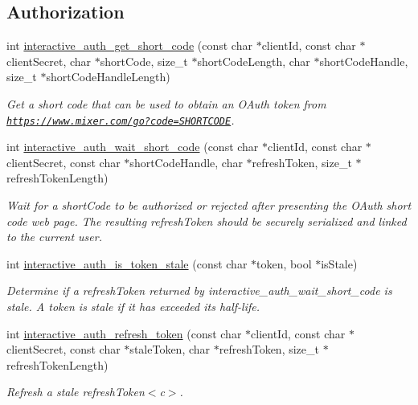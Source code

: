 \subsection*{Authorization}
\begin{DoxyCompactItemize}
\item 
int \mbox{\hyperlink{group___interactivity_ga933fa6f40b4d9728b20286badcf0b4f5}{interactive\+\_\+auth\+\_\+get\+\_\+short\+\_\+code}} (const char $\ast$client\+Id, const char $\ast$client\+Secret, char $\ast$short\+Code, size\+\_\+t $\ast$short\+Code\+Length, char $\ast$short\+Code\+Handle, size\+\_\+t $\ast$short\+Code\+Handle\+Length)
\begin{DoxyCompactList}\small\item\em Get a short code that can be used to obtain an O\+Auth token from {\ttfamily \href{https://www.mixer.com/go?code=SHORTCODE}{\tt https\+://www.\+mixer.\+com/go?code=\+S\+H\+O\+R\+T\+C\+O\+DE}}. \end{DoxyCompactList}\item 
int \mbox{\hyperlink{group___interactivity_ga16c877f68b6ff400719fc50e3c824a83}{interactive\+\_\+auth\+\_\+wait\+\_\+short\+\_\+code}} (const char $\ast$client\+Id, const char $\ast$client\+Secret, const char $\ast$short\+Code\+Handle, char $\ast$refresh\+Token, size\+\_\+t $\ast$refresh\+Token\+Length)
\begin{DoxyCompactList}\small\item\em Wait for a {\ttfamily short\+Code} to be authorized or rejected after presenting the O\+Auth short code web page. The resulting {\ttfamily refresh\+Token} should be securely serialized and linked to the current user. \end{DoxyCompactList}\item 
int \mbox{\hyperlink{group___interactivity_gadc0bce85838a4ef26479f05cee15ce3f}{interactive\+\_\+auth\+\_\+is\+\_\+token\+\_\+stale}} (const char $\ast$token, bool $\ast$is\+Stale)
\begin{DoxyCompactList}\small\item\em Determine if a {\ttfamily refresh\+Token} returned by {\ttfamily interactive\+\_\+auth\+\_\+wait\+\_\+short\+\_\+code} is stale. A token is stale if it has exceeded its half-\/life. \end{DoxyCompactList}\item 
int \mbox{\hyperlink{group___interactivity_ga13cfa6f76168be83cf29602bdcf1d0fc}{interactive\+\_\+auth\+\_\+refresh\+\_\+token}} (const char $\ast$client\+Id, const char $\ast$client\+Secret, const char $\ast$stale\+Token, char $\ast$refresh\+Token, size\+\_\+t $\ast$refresh\+Token\+Length)
\begin{DoxyCompactList}\small\item\em Refresh a stale {\ttfamily refresh\+Token$<$c$>$. }


\end{DoxyCompactList}
\end{DoxyCompactItemize}
